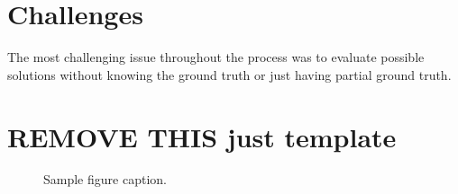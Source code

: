 \documentclass{article}
\begin{document}
    
    \section{Challenges} %
    The most challenging issue throughout the process was to evaluate possible solutions without knowing the ground truth or just having partial ground truth.

    \section{REMOVE THIS just template}
	
	\begin{figure}
		\centering
		\fbox{\rule[-.5cm]{0cm}{4cm} \rule[-.5cm]{4cm}{0cm}}
		\caption{Sample figure caption.}
	\end{figure}
	
	
	
	
	
	
	
	
	
	
	
	\printbibliography %
	
	
\end{document}
